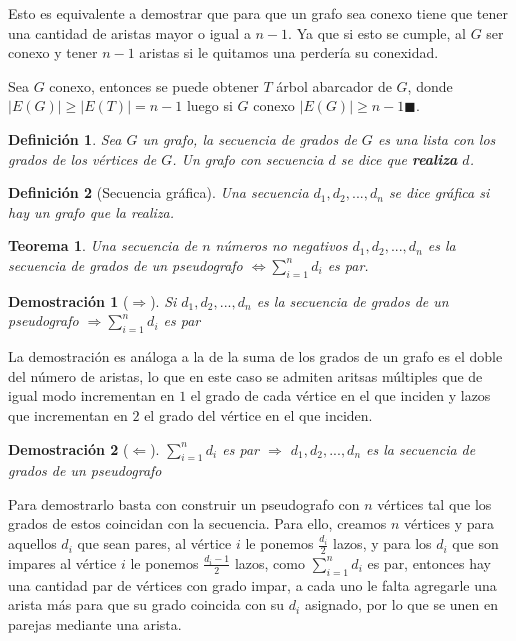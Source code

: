 \documentclass[a4paper,1pt]{report}
\newtheorem*{teo}{Teorema}
\newtheorem*{dem}{Demostración}
\newtheorem*{dfn}{Definición}
\begin{document}
Esto es equivalente a demostrar que para que un grafo sea conexo tiene que tener una cantidad de aristas mayor o igual a $n-1$. Ya que si esto se cumple, al $G$ ser conexo y tener $n-1$ aristas si le quitamos una perder\'ia su conexidad.

Sea $G$ conexo, entonces se puede obtener $T$ \'arbol abarcador de $G$, donde $|E(G)| \geq |E(T)| = n-1$ luego si $G$ conexo $|E(G)| \geq n-1 \blacksquare$. 


\begin{dfn}
    Sea $G$ un grafo, la secuencia de grados de $G$ es una lista con los grados de los v\'ertices de $G$. Un grafo con secuencia $d$ se dice que \textbf{realiza} $d$.
\end{dfn}

\begin{dfn}[Secuencia gr\'afica]
    Una secuencia $d_1, d_2, ..., d_n$ se dice gr\'afica si hay un grafo que la realiza.
\end{dfn}

\begin{teo}
    Una secuencia de $n$ n\'umeros no negativos $d_1, d_2,..., d_n$ es la secuencia de grados de un pseudografo $\Leftrightarrow \sum_{i=1}^{n} d_i$ es par.
\end{teo}

\begin{dem}[$\Rightarrow$] Si $d_1, d_2,..., d_n$ es la secuencia de grados de un pseudografo  $\Rightarrow \sum_{i=1}^{n} d_i$ es par\end{dem}

La demostraci\'on es an\'aloga a la de la suma de los grados de un grafo es el doble del n\'umero de aristas, lo que en este caso se admiten aritsas m\'ultiples que de igual modo incrementan en $1$ el grado de cada v\'ertice en el que inciden y lazos que incrementan en $2$ el grado del v\'ertice en el que inciden.

\begin{dem}[$\Leftarrow$]  $\sum_{i=1}^{n} d_i$ es par $\Rightarrow$ $d_1, d_2,..., d_n$ es la secuencia de grados de un pseudografo \end{dem}

Para demostrarlo basta con construir un pseudografo con $n$ v\'ertices tal que los grados de estos coincidan con la secuencia. Para ello, creamos $n$ v\'ertices y para aquellos $d_i$ que sean pares, al v\'ertice $i$ le ponemos $\frac{d_i}{2}$ lazos, y para los $d_i$ que son impares al v\'ertice $i$ le ponemos $\frac{d_i -1}{2}$ lazos, como $\sum_{i=1}^n d_i$ es par, entonces hay una cantidad par de v\'ertices con grado impar, a cada uno le falta agregarle una arista m\'as para que su grado coincida con su $d_i$ asignado, por lo que se unen en parejas mediante una arista.
\end{document}

